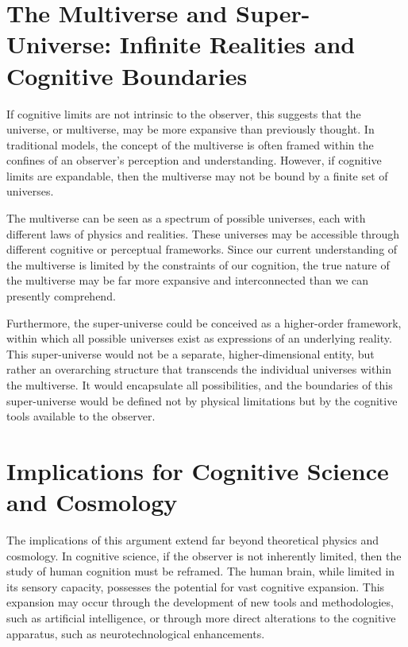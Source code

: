 \documentclass[twocolumn]{article}
\begin{document}
    \section{The Multiverse and Super-Universe: Infinite Realities and Cognitive Boundaries}
    \label{sec:the-multiverse-and-super-universe:-infinite-realities-and-cognitive-boundaries}

    If cognitive limits are not intrinsic to the observer, this suggests that the universe, or multiverse,
    may be more expansive than previously thought.
    In traditional models, the concept of the multiverse is often framed within the confines
    of an observer's perception and understanding.
    However, if cognitive limits are expandable,
    then the multiverse may not be bound by a finite set of universes.

    The multiverse can be seen as a spectrum of possible universes, each with different laws of physics and realities.
    These universes may be accessible through different cognitive or perceptual frameworks.
    Since our current understanding of the multiverse is limited by the constraints of our cognition,
    the true nature of the multiverse may be far more expansive and interconnected than we can presently comprehend.

    Furthermore, the super-universe could be conceived as a higher-order framework,
    within which all possible universes exist as expressions of an underlying reality.
    This super-universe would not be a separate, higher-dimensional entity,
    but rather an overarching structure that transcends the individual universes within the multiverse.
    It would encapsulate all possibilities, and the boundaries of this super-universe would be defined
    not by physical limitations but by the cognitive tools available to the observer.


    \section{Implications for Cognitive Science and Cosmology}
    \label{sec:implications-for-cognitive-science-and-cosmology}

    The implications of this argument extend far beyond theoretical physics and cosmology.
    In cognitive science, if the observer is not inherently limited, then the study of human cognition must be reframed.
    The human brain, while limited in its sensory capacity, possesses the potential for vast cognitive expansion.
    This expansion may occur through the development of new tools and methodologies, such as artificial intelligence,
    or through more direct alterations to the cognitive apparatus, such as neurotechnological enhancements.
\end{document}
